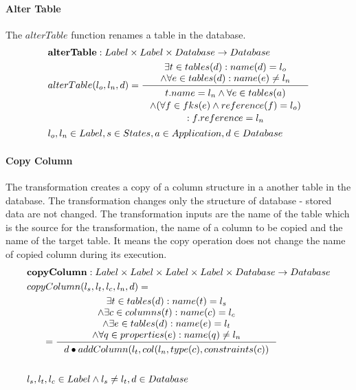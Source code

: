 \documentclass[11pt]{article}
\begin{document}
\paragraph{Alter Table} The $alterTable$ function renames a table in  the database.
\begin{align*}
&	\mathbf{alterTable} : Label \times Label \times Database \rightarrow Database \\
&	alterTable(l_o, l_n, d) = \inference{\exists t \in tables(d) : name(d) = l_o \\ \wedge \forall e \in tables(d) : name(e) \neq l_n}{\begin{gathered}
		t.name = l_n \wedge \forall e \in tables(a) \\ \wedge ( \forall f \in fks(e) \wedge reference(f) = l_o ) \\ : f.reference = l_n 
	\end{gathered}}\\
&	l_o, l_n \in Label, s \in States, a \in Application, d \in Database
\end{align*}

\paragraph{Copy Column} The transformation creates a copy of a column structure in a another table in the database. The transformation changes only the structure of database - stored data are not changed. The transformation inputs are the name of the table which is the source for the transformation, the name of a column to be copied and the name of the target table. It means the copy operation does not change the name of copied column during its execution. 
\begin{align*}
&	\mathbf{copyColumn} : Label \times Label \times Label \times Label \times Database \rightarrow Database \\
&	copyColumn(l_s, l_t, l_c, l_n, d) = \\
& \;\;\;\;\;\;=%
 		\inference{\exists t \in tables(d) : name(t) = l_s \\ \wedge \exists c \in columns(t) : name(c) = l_c \\ \wedge \exists e \in tables(d) : name(e) = l_t  \\ \wedge \forall q \in properties(e) : name(q) \neq l_n}{\begin{gathered}
d \bullet addColumn(l_t, col(l_n, type(c), constraints(c))
\end{gathered}} 
	\\\\
&	l_s,l_t,l_c \in Label \wedge l_s \neq l_t,d \in Database
\end{align*}
\end{document}
